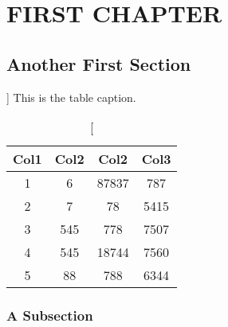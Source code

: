 \chapter{FIRST CHAPTER}


\section{Another First Section}



\lipsum[1-2]


\begin{table}[h!]
\centering
\caption%
 []
 {This is the table caption.\label{table}}
 \begin{tabular}{||c c c c||} 
 \hline
 Col1 & Col2 & Col2 & Col3 \\ [0.5ex] 
 \hline\hline
 1 & 6 & 87837 & 787 \\ 
 2 & 7 & 78 & 5415 \\
 3 & 545 & 778 & 7507 \\
 4 & 545 & 18744 & 7560 \\
 5 & 88 & 788 & 6344 \\ [1ex] 
 \hline
 \end{tabular}
\end{table}

\subsection{A Subsection}



\lipsum[3-4]\autocite{einstein}
